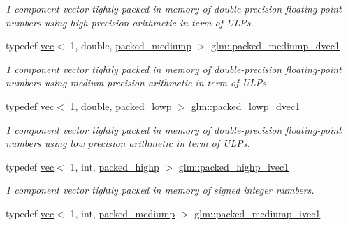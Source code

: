 \begin{DoxyCompactItemize}
\begin{DoxyCompactList}\small\item\em 1 component vector tightly packed in memory of double-\/precision floating-\/point numbers using high precision arithmetic in term of U\+L\+Ps. \end{DoxyCompactList}\item 
typedef \mbox{\hyperlink{structglm_1_1vec}{vec}}$<$ 1, double, \mbox{\hyperlink{namespaceglm_a36ed105b07c7746804d7fdc7cc90ff25a9604654c3b137cd7898689fd34b25bc0}{packed\+\_\+mediump}} $>$ \mbox{\hyperlink{group__gtc__type__aligned_gaf34b2d86391c45507ccc7c605992b8d3}{glm\+::packed\+\_\+mediump\+\_\+dvec1}}
\begin{DoxyCompactList}\small\item\em 1 component vector tightly packed in memory of double-\/precision floating-\/point numbers using medium precision arithmetic in term of U\+L\+Ps. \end{DoxyCompactList}\item 
typedef \mbox{\hyperlink{structglm_1_1vec}{vec}}$<$ 1, double, \mbox{\hyperlink{namespaceglm_a36ed105b07c7746804d7fdc7cc90ff25ac36a4bd74559be2c0b65bc48e5953b8b}{packed\+\_\+lowp}} $>$ \mbox{\hyperlink{group__gtc__type__aligned_gab43886895b98688f4ebbc395e5a633ff}{glm\+::packed\+\_\+lowp\+\_\+dvec1}}
\begin{DoxyCompactList}\small\item\em 1 component vector tightly packed in memory of double-\/precision floating-\/point numbers using low precision arithmetic in term of U\+L\+Ps. \end{DoxyCompactList}\item 
typedef \mbox{\hyperlink{structglm_1_1vec}{vec}}$<$ 1, int, \mbox{\hyperlink{namespaceglm_a36ed105b07c7746804d7fdc7cc90ff25a8e8791ee77fe079b1291f710d88031bf}{packed\+\_\+highp}} $>$ \mbox{\hyperlink{group__gtc__type__aligned_ga7fde67656fb5726169114054992f0a3f}{glm\+::packed\+\_\+highp\+\_\+ivec1}}
\begin{DoxyCompactList}\small\item\em 1 component vector tightly packed in memory of signed integer numbers. \end{DoxyCompactList}\item 
typedef \mbox{\hyperlink{structglm_1_1vec}{vec}}$<$ 1, int, \mbox{\hyperlink{namespaceglm_a36ed105b07c7746804d7fdc7cc90ff25a9604654c3b137cd7898689fd34b25bc0}{packed\+\_\+mediump}} $>$ \mbox{\hyperlink{group__gtc__type__aligned_ga2086cbb8b85fe406f4be46fdff491304}{glm\+::packed\+\_\+mediump\+\_\+ivec1}}

\end{DoxyCompactItemize}
